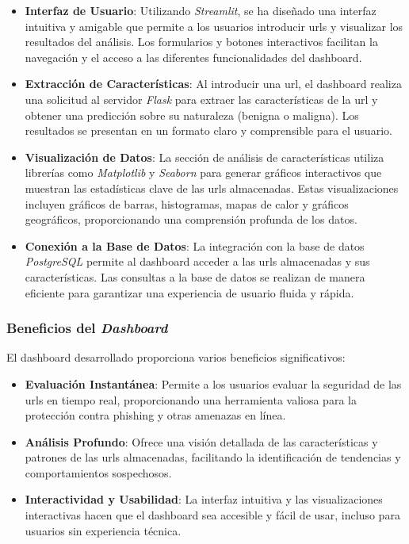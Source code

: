 \begin{itemize}
    \item \textbf{Interfaz de Usuario}: Utilizando \textit{Streamlit}, se ha diseñado una interfaz intuitiva y amigable que permite a los usuarios introducir \glspl{url} y visualizar los resultados del análisis. Los formularios y botones interactivos facilitan la navegación y el acceso a las diferentes funcionalidades del \gls{dashboard}.

    \item \textbf{Extracción de Características}: Al introducir una \gls{url}, el \gls{dashboard} realiza una solicitud al servidor \textit{Flask} para extraer las características de la \gls{url} y obtener una predicción sobre su naturaleza (benigna o maligna). Los resultados se presentan en un formato claro y comprensible para el usuario.

    \item \textbf{Visualización de Datos}: La sección de análisis de características utiliza librerías como \textit{Matplotlib} y \textit{Seaborn} para generar gráficos interactivos que muestran las estadísticas clave de las \glspl{url} almacenadas. Estas visualizaciones incluyen gráficos de barras, histogramas, mapas de calor y gráficos geográficos, proporcionando una comprensión profunda de los datos.

    \item \textbf{Conexión a la Base de Datos}: La integración con la base de datos \textit{PostgreSQL} permite al \gls{dashboard} acceder a las \glspl{url} almacenadas y sus características. Las consultas a la base de datos se realizan de manera eficiente para garantizar una experiencia de usuario fluida y rápida.
\end{itemize}

\subsubsection*{Beneficios del \textit{Dashboard}}

El \gls{dashboard} desarrollado proporciona varios beneficios significativos:

\begin{itemize}
    \item \textbf{Evaluación Instantánea}: Permite a los usuarios evaluar la seguridad de las \glspl{url} en tiempo real, proporcionando una herramienta valiosa para la protección contra \gls{phishing} y otras amenazas en línea.

    \item \textbf{Análisis Profundo}: Ofrece una visión detallada de las características y patrones de las \glspl{url} almacenadas, facilitando la identificación de tendencias y comportamientos sospechosos.

    \item \textbf{Interactividad y Usabilidad}: La interfaz intuitiva y las visualizaciones interactivas hacen que el \gls{dashboard} sea accesible y fácil de usar, incluso para usuarios sin experiencia técnica.
\end{itemize}
